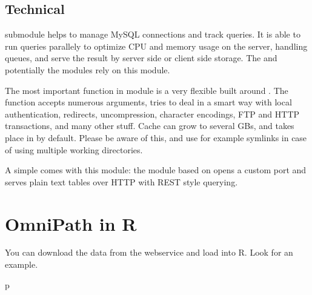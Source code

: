 \documentclass[letterpaper,10pt,english]{sphinxmanual}
\begin{document}
\section{Technical}
\label{\detokenize{index:technical}}
 submodule helps to manage MySQL connections and track queries. It is
able to run queries parallely to optimize CPU and memory usage on the server,
handling queues, and serve the result by server side or client side storage.
The  and potentially the  modules rely on this 
module.

The most important function in module  is a very flexible  built around . The function  accepts
numerous arguments, tries to deal in a smart way with local 
authentication, redirects, uncompression, character encodings, FTP and HTTP
transactions, and many other stuff. Cache can grow to several GBs, and takes
place in  by default. Please be aware of this, and use for example
symlinks in case of using multiple working directories.

A simple  comes with this module: the  module based on
 opens a custom port and serves plain text tables over
HTTP with REST style querying.


\chapter{OmniPath in R}
\label{\detokenize{index:omnipath-in-r}}
You can download the data from the webservice and load into R. Look
 for an
example.


\renewcommand{\indexname}{Python Module Index}
\begin{sphinxtheindex}
\def\bigletter#1{{\Large\sffamily#1}\nopagebreak\vspace{1mm}}
\bigletter{p}
\item {}
\end{sphinxtheindex}

\renewcommand{\indexname}{Index}
\printindex
\end{document}

